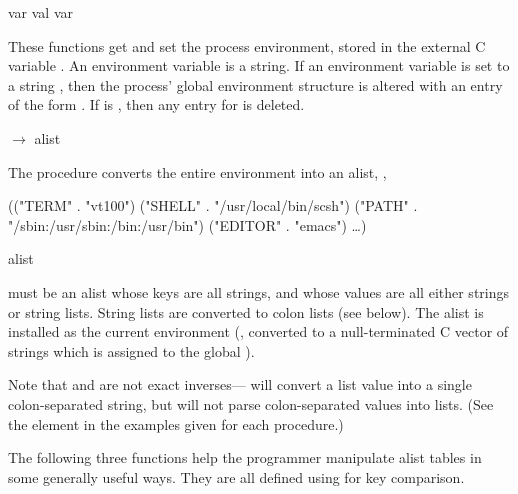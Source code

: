  {var val} \undefined
{} {var}     \str
\begin{desc}
These functions get and set the process environment, stored in the
external C variable .
An environment variable  is a string.
If an environment variable is set to a string , 
then the process' global environment structure is altered with an entry 
of the form .
If  is {\sharpf}, then any entry for  is deleted.
\end{desc}

      {{\str$\rightarrow$\str} alist}
\begin{desc}
    The  procedure converts the entire environment into
    an alist, \eg,
\begin{code}
(("TERM" . "vt100")
 ("SHELL" . "/usr/local/bin/scsh") 
 ("PATH" . "/sbin:/usr/sbin:/bin:/usr/bin")
 ("EDITOR" . "emacs") 
 \ldots)\end{code}
\end{desc}

 {alist} \undefined
\begin{desc}
     must be an alist whose keys are all strings, and whose values
    are all either strings or string lists. String lists are converted to
    colon lists (see below). The alist is installed as the current {\Unix}
    environment (\ie, converted to a null-terminated C vector of
     strings which is assigned to the global
    ).


Note that  and  are not exact 
inverses--- will convert a list value into a single
colon-separated string, but  will not parse colon-separated
values into lists. (See the  element in the examples given for
each procedure.)

\end{desc}

The following three functions help the programmer manipulate alist
tables in some generally useful ways. They are all defined using
 for key comparison.

